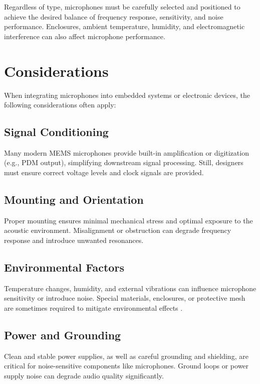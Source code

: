 \bigskip
Regardless of type, microphones must be carefully selected and positioned to achieve the desired balance of frequency response, sensitivity, and noise performance. Enclosures, ambient temperature, humidity, and electromagnetic interference can also affect microphone performance.

\section{Considerations}

\bigskip
When integrating microphones into embedded systems or electronic devices, the following considerations often apply:

\subsection{Signal Conditioning}

\bigskip
Many modern MEMS microphones provide built-in amplification or digitization (e.g., PDM output), simplifying downstream signal processing. Still, designers must ensure correct voltage levels and clock signals are provided.

\subsection{Mounting and Orientation}

\bigskip
Proper mounting ensures minimal mechanical stress and optimal exposure to the acoustic environment. Misalignment or obstruction can degrade frequency response and introduce unwanted resonances.

\subsection{Environmental Factors}

\bigskip
Temperature changes, humidity, and external vibrations can influence microphone sensitivity or introduce noise. Special materials, enclosures, or protective mesh are sometimes required to mitigate environmental effects \cite{Eargle:2012}.

\subsection{Power and Grounding}

\bigskip
Clean and stable power supplies, as well as careful grounding and shielding, are critical for noise-sensitive components like microphones. Ground loops or power supply noise can degrade audio quality significantly.


